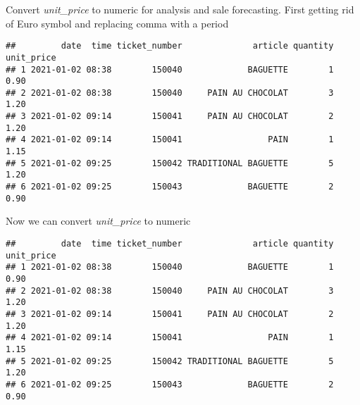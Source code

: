 \documentclass[
]{article}
\newenvironment{Shaded}{\begin{snugshade}}{\end{snugshade}}
\newcommand{\CommentTok}[1]{\textcolor[rgb]{0.56,0.35,0.01}{\textit{#1}}}
\newcommand{\FunctionTok}[1]{\textcolor[rgb]{0.00,0.00,0.00}{#1}}
\newcommand{\NormalTok}[1]{#1}
\newcommand{\OtherTok}[1]{\textcolor[rgb]{0.56,0.35,0.01}{#1}}
\newcommand{\SpecialCharTok}[1]{\textcolor[rgb]{0.00,0.00,0.00}{#1}}
\newcommand{\StringTok}[1]{\textcolor[rgb]{0.31,0.60,0.02}{#1}}
\begin{document}
Convert \emph{unit\_price} to numeric for analysis and sale forecasting.
First getting rid of Euro symbol and replacing comma with a period

\begin{Shaded}
\end{Shaded}

\begin{verbatim}
##         date  time ticket_number              article quantity unit_price
## 1 2021-01-02 08:38        150040             BAGUETTE        1      0.90 
## 2 2021-01-02 08:38        150040     PAIN AU CHOCOLAT        3      1.20 
## 3 2021-01-02 09:14        150041     PAIN AU CHOCOLAT        2      1.20 
## 4 2021-01-02 09:14        150041                 PAIN        1      1.15 
## 5 2021-01-02 09:25        150042 TRADITIONAL BAGUETTE        5      1.20 
## 6 2021-01-02 09:25        150043             BAGUETTE        2      0.90
\end{verbatim}

Now we can convert \emph{unit\_price} to numeric

\begin{Shaded}
\end{Shaded}

\begin{verbatim}
##         date  time ticket_number              article quantity unit_price
## 1 2021-01-02 08:38        150040             BAGUETTE        1       0.90
## 2 2021-01-02 08:38        150040     PAIN AU CHOCOLAT        3       1.20
## 3 2021-01-02 09:14        150041     PAIN AU CHOCOLAT        2       1.20
## 4 2021-01-02 09:14        150041                 PAIN        1       1.15
## 5 2021-01-02 09:25        150042 TRADITIONAL BAGUETTE        5       1.20
## 6 2021-01-02 09:25        150043             BAGUETTE        2       0.90
\end{verbatim}
\end{document}
